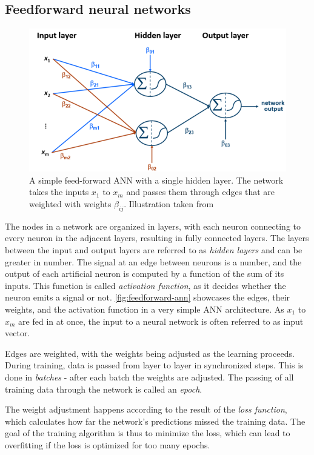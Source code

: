 \subsection{Feedforward neural networks}
\label{sec:feedforward-networks}
\begin{figure}[ht!]
    \centering
    \includegraphics[width=.85\textwidth]{gfx/feedforward-neural-network.png}
    \caption[Feed-forward ANN with a single hidden layer]{A simple feed-forward ANN with a single hidden layer. The network takes the inputs $x_1$ to $x_m$ and passes them through edges that are weighted with weights $\beta_{ij}$. Illustration taken from \cite{lessmannBADS}}
    \label{fig:feedforward-ann}
\end{figure}

The nodes in a network are organized in layers, with each neuron connecting to every neuron in the adjacent layers, resulting in fully connected layers. The layers between the input and output layers are referred to as \textit{hidden layers} and  can be greater in number. The signal at an edge between neurons is a number, and the output of each artificial neuron is computed by a function of the sum of its inputs. This function is called \textit{activation function}, as it decides whether the neuron emits a signal or not. \autoref{fig:feedforward-ann} showcases the edges, their weights, and the activation function in a very simple ANN architecture. As $x_1$ to $x_m$ are fed in at once, the input to a neural network is often referred to as input vector.

Edges are weighted, with the weights being adjusted as the learning proceeds. During training, data is passed from layer to layer in synchronized steps. This is done in \textit{batches} - after each batch the weights are adjusted. The passing of all training data through the network is called an \textit{epoch}.

The weight adjustment happens according to the result of the \textit{loss function}, which calculates how far the network's predictions missed the training data. The goal of the training algorithm is thus to minimize the loss, which can lead to overfitting if the loss is optimized for too many epochs.

